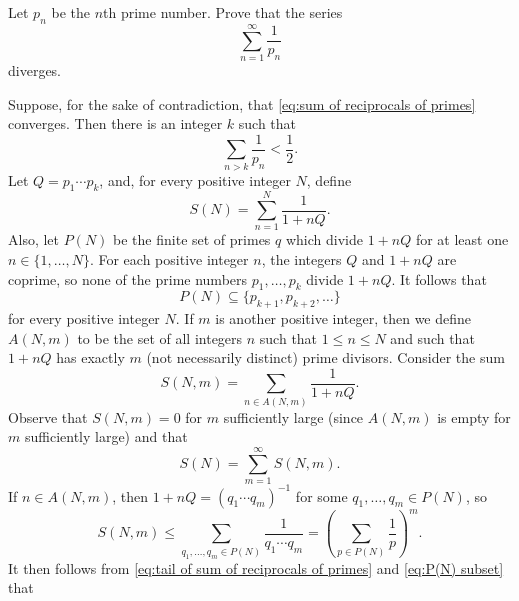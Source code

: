 \documentclass[a4paper,11pt]{ltjsarticle} %
\begin{document}
\begin{problem}
Let $p_n$ be the $n$th prime number.
Prove that the series
\begin{equation}
\label{eq:sum of reciprocals of primes}
\sum_{n=1}^\infty \frac{1}{p_n}
\end{equation}
diverges.
\end{problem}

\begin{solution}
Suppose, for the sake of contradiction, that
\eqref{eq:sum of reciprocals of primes} converges.
Then there is an integer $k$ such that
\begin{equation}
\label{eq:tail of sum of reciprocals of primes}
\sum_{n > k} \frac{1}{p_n} < \frac{1}{2}.
\end{equation}
Let $Q = p_1 \cdots p_k$, and, for every positive integer $N$, define
\begin{equation*}
S(N) = \sum_{n=1}^N \frac{1}{1 + n Q}.
\end{equation*}
Also, let $P(N)$ be the finite set of primes $q$ which divide $1 + n Q$ for at
least one $n \in \{1,\ldots,N\}$.
For each positive integer $n$, the integers $Q$ and $1 + n Q$ are coprime, so
none of the prime numbers $p_1,\ldots,p_k$ divide $1 + n Q$.
It follows that
\begin{equation}
\label{eq:P(N) subset}
P(N) \subseteq \{p_{k+1}, p_{k+2}, \ldots\}
\end{equation}
for every positive integer $N$.
If $m$ is another positive integer, then we define $A(N, m)$ to be the set of
all integers $n$ such that $1 \leq n \leq N$ and such that $1 + n Q$ has exactly
$m$ (not necessarily distinct) prime divisors.
Consider the sum
\begin{equation*}
S(N, m) = \sum_{n \in A(N, m)} \frac{1}{1 + n Q}.
\end{equation*}
Observe that $S(N, m) = 0$ for $m$ sufficiently large (since $A(N,m)$ is empty
for $m$ sufficiently large) and that
\begin{equation}
\label{eq:S(N) as sum}
S(N)
= \sum_{m=1}^\infty S(N, m).
\end{equation}
If $n \in A(N, m)$, then $1 + n Q =  (q_1\cdots q_m)^{-1}$ for some
$q_1,\ldots,q_m \in P(N)$, so
\begin{equation*}
S(N, m)
\leq \sum_{q_1,\ldots,q_m \in P(N)} \frac{1}{q_1\cdots q_m}
= \left(\sum_{p \in P(N)} \frac{1}{p}\right)^{m}.
\end{equation*}
It then follows from \eqref{eq:tail of sum of reciprocals of primes} and
\eqref{eq:P(N) subset} that

\end{solution}
\end{document}
